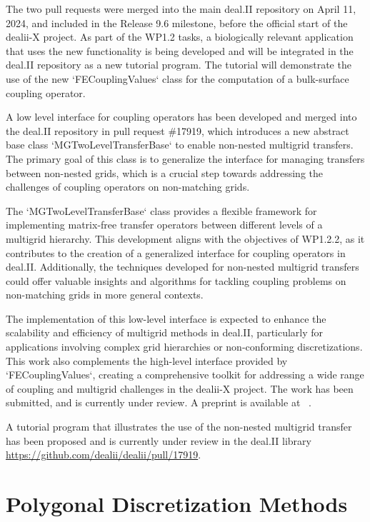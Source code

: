 \documentclass[a4paper,12pt]{article}
\begin{document}
    The two pull requests were merged into the main deal.II repository on April
    11, 2024, and included in the Release 9.6 milestone, before the official
    start of the dealii-X project. As part of the WP1.2 tasks, a biologically
    relevant application that uses the new functionality is being developed and
    will be integrated in the deal.II repository as a new tutorial program. The
    tutorial will demonstrate the use of the new `FECouplingValues` class for
    the computation of a bulk-surface coupling operator.

    A low level interface for coupling operators has been developed and merged
    into the deal.II repository in pull request \#17919, which introduces a new
    abstract base class `MGTwoLevelTransferBase` to enable non-nested multigrid
    transfers. The primary goal of this class is to generalize the interface for
    managing transfers between non-nested grids, which is a crucial step towards
    addressing the challenges of coupling operators on non-matching grids. 

    The `MGTwoLevelTransferBase` class provides a flexible framework for
    implementing matrix-free transfer operators between different levels of a
    multigrid hierarchy. This development aligns with the objectives of WP1.2.2,
    as it contributes to the creation of a generalized interface for coupling
    operators in deal.II. Additionally, the techniques developed for non-nested
    multigrid transfers could offer valuable insights and algorithms for
    tackling coupling problems on non-matching grids in more general contexts.

    The implementation of this low-level interface is expected to enhance the
    scalability and efficiency of multigrid methods in deal.II, particularly for
    applications involving complex grid hierarchies or non-conforming
    discretizations. This work also complements the high-level interface
    provided by `FECouplingValues`, creating a comprehensive toolkit for
    addressing a wide range of coupling and multigrid challenges in the dealii-X
    project. The work has been submitted, and is currently under review. A
    preprint is available at ~\cite{FederEtAl2024b}.

   A tutorial program that illustrates the use of the non-nested multigrid
   transfer has been proposed and is currently under review in the deal.II
   library
    \url{https://github.com/dealii/dealii/pull/17919}.


\section{Polygonal Discretization Methods}
\end{document}
